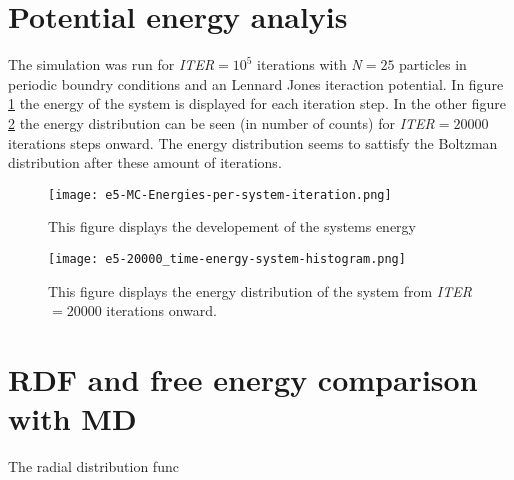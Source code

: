 \documentclass{article}[a4paper]
\begin{document}
\section{Potential energy analyis}
The simulation was run for \textit{ITER}$=10^5$ iterations with \textit{N}$=25$ particles in periodic boundry conditions and an Lennard Jones iteraction potential.
In figure \ref{fig:energy_developement} the energy of the system is displayed for each iteration step. In the other figure \ref{fig:energy_distribution} the energy distribution can be seen (in number of counts) for \textit{ITER}$=20000$ iterations steps onward. The energy distribution seems to sattisfy the Boltzman distribution after these amount of iterations.

\begin{figure}[h!]
    \centering
    \texttt{[image: e5-MC-Energies-per-system-iteration.png]}
    \caption{This figure displays the developement of the systems energy }
    \label{fig:energy_developement}
\end{figure}


\begin{figure}[h!]
    \centering    
    \texttt{[image: e5-20000\_time-energy-system-histogram.png]}
    \caption{This figure displays the energy distribution of the system from \textit{ITER}$=20000$ iterations onward.}
    \label{fig:energy_distribution}
\end{figure}

\newpage
\section{RDF and free energy comparison with MD}

The radial distribution func
\end{document}
